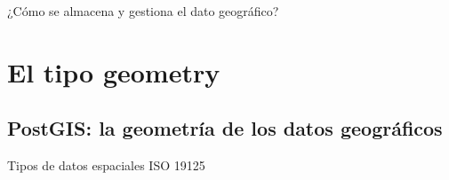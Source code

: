 \documentclass{classes/beamer_GeomaticaUA}
\begin{document}
\begin{frame}{¿Cómo se almacena y gestiona el dato geográfico?}
\begin{center}
\resizebox{1.15\textheight}{!}{}
\end{center}
\end{frame}

\section[Geometría]{El tipo geometry}
\subsection{PostGIS: la geometría de los datos geográficos}

\begin{frame}{Tipos de datos espaciales ISO 19125}
\begin{center}
{}
\end{center}
\end{frame}
\end{document}
